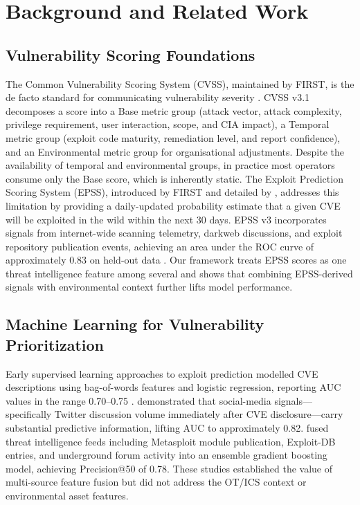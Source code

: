 \documentclass[review,12pt]{elsarticle}
\begin{document}
\section{Background and Related Work}
\label{sec:background}

\subsection{Vulnerability Scoring Foundations}

The Common Vulnerability Scoring System (CVSS), maintained by FIRST, is the de facto standard for communicating vulnerability severity \citep{cvss}. CVSS v3.1 decomposes a score into a Base metric group (attack vector, attack complexity, privilege requirement, user interaction, scope, and CIA impact), a Temporal metric group (exploit code maturity, remediation level, and report confidence), and an Environmental metric group for organisational adjustments. Despite the availability of temporal and environmental groups, in practice most operators consume only the Base score, which is inherently static. The Exploit Prediction Scoring System (EPSS), introduced by FIRST and detailed by \citet{jacobs2023}, addresses this limitation by providing a daily-updated probability estimate that a given CVE will be exploited in the wild within the next 30 days. EPSS v3 incorporates signals from internet-wide scanning telemetry, darkweb discussions, and exploit repository publication events, achieving an area under the ROC curve of approximately 0.83 on held-out data \citep{jacobs2023}. Our framework treats EPSS scores as one threat intelligence feature among several and shows that combining EPSS-derived signals with environmental context further lifts model performance.

\subsection{Machine Learning for Vulnerability Prioritization}

Early supervised learning approaches to exploit prediction modelled CVE descriptions using bag-of-words features and logistic regression, reporting AUC values in the range 0.70--0.75 \citep{bozorgi2010}. \citet{sabottke2015} demonstrated that social-media signals---specifically Twitter discussion volume immediately after CVE disclosure---carry substantial predictive information, lifting AUC to approximately 0.82. \citet{krause2022} fused threat intelligence feeds including Metasploit module publication, Exploit-DB entries, and underground forum activity into an ensemble gradient boosting model, achieving Precision@50 of 0.78. These studies established the value of multi-source feature fusion but did not address the OT/ICS context or environmental asset features.
\end{document}
